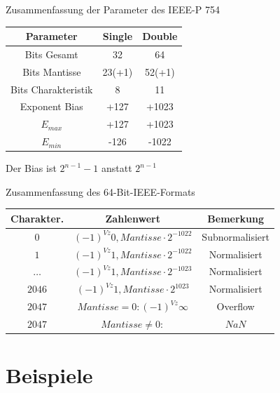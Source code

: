 \documentclass[12pt%
,xcolor=table
,aspectratio=169%
]{beamer}
\begin{document}
\begin{frame}{Zusammenfassung der Parameter des IEEE-P 754}
\begin{table}[]
\begin{tabular}{|c|c|c|}
\hline
\rowcolor[HTML]{656565} 
{\color[HTML]{333333} \textbf{Parameter}} & {\color[HTML]{333333} \textbf{Single}} & {\color[HTML]{333333} \textbf{Double}} \\ \hline
Bits Gesamt 			& 32 			& 64		\\ \hline
Bits Mantisse          & 23(+1) 		& 52(+1)    \\ \hline
Bits Charakteristik    & 8				& 11        \\ \hline
Exponent Bias  			&  +127			& +1023     \\ \hline
$E_{max}$ 				& +127       	& +1023 	\\ \hline
$E_{min}$ 				&  -126      	& -1022 	\\ \hline
\end{tabular}
\end{table}
Der Bias ist $2^{n-1}-1$ anstatt $2^{n-1}$
\end{frame}

\begin{frame}{Zusammenfassung des 64-Bit-IEEE-Formats}
\begin{table}[]
\begin{tabular}{|c|c|c|}
\hline
\rowcolor[HTML]{656565} 
{\color[HTML]{333333} \textbf{Charakter.}} & {\color[HTML]{333333} \textbf{Zahlenwert}} & {\color[HTML]{333333} \textbf{Bemerkung}} \\ \hline
$0$ 			& $(-1)^{Vz} 0,Mantisse \cdot 2^{-1022}$ 		& Subnormalisiert	\\ \hline
$1$ 			& $(-1)^{Vz} 1,Mantisse \cdot 2^{-1022}$  		&  Normalisiert   	\\ \hline
$\ldots$		& $(-1)^{Vz} 1,Mantisse \cdot 2^{-1023}$ 		&    Normalisiert 	\\ \hline
$2046$			& $(-1)^{Vz} 1,Mantisse \cdot 2^{1023}$		&	Normalisiert	\\ \hline
$2047$ 			& $Mantisse = 0 : (-1)^{Vz} \infty$     		& Overflow 	\\ \hline
$2047$ 			& $Mantisse \neq 0 :$					 		& $NaN$ 	\\ \hline
\end{tabular}
\end{table}
\end{frame}
\section{Beispiele}
\end{document}
